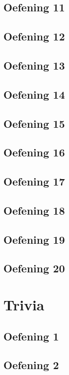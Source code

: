 \documentclass[a4paper,11pt]{report}
\begin{document}
\section{Oefening 11}

\section{Oefening 12}

\section{Oefening 13}

\section{Oefening 14}

\section{Oefening 15}

\section{Oefening 16}

\section{Oefening 17}

\section{Oefening 18}

\section{Oefening 19}

\section{Oefening 20}

\newpage

\chapter{Trivia}
\section{Oefening 1}

\section{Oefening 2}

\end{document}

